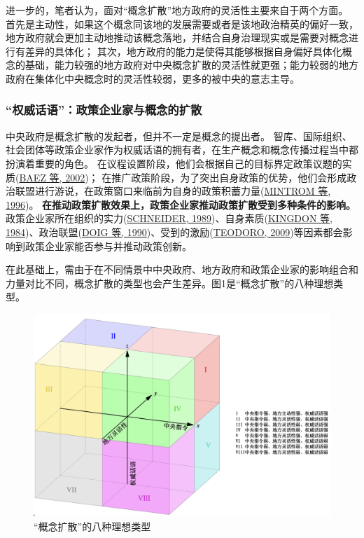 \documentclass[
  12pt,
]{ctexart}
\begin{document}
进一步的，笔者认为，面对``概念扩散''地方政府的灵活性主要来自于两个方面。
首先是主动性，如果这个概念同该地的发展需要或者是该地政治精英的偏好一致，地方政府就会更加主动地推动该概念落地，并结合自身治理现实或是需要对概念进行有差异的具体化；
其次，地方政府的能力是使得其能够根据自身偏好具体化概念的基础，能力较强的地方政府对中央概念扩散的灵活性就更强；能力较弱的地方政府在集体化中央概念时的灵活性较弱，更多的被中央的意志主导。

\hypertarget{ux6743ux5a01ux8bddux8bedux653fux7b56ux4f01ux4e1aux5bb6ux4e0eux6982ux5ff5ux7684ux6269ux6563}{%
\subsubsection{``权威话语''：政策企业家与概念的扩散}\label{ux6743ux5a01ux8bddux8bedux653fux7b56ux4f01ux4e1aux5bb6ux4e0eux6982ux5ff5ux7684ux6269ux6563}}

中央政府是概念扩散的发起者，但并不一定是概念的提出者。
智库、国际组织、社会团体等政策企业家作为权威话语的拥有者，在生产概念和概念传播过程当中都扮演着重要的角色。
在议程设置阶段，他们会根据自己的目标界定政策议题的实质(\protect\hyperlink{ref-BaezAbolafia2002}{BAEZ 等, 2002})；
在推广政策阶段，为了突出自身政策的优势，他们会形成政治联盟进行游说，在政策窗口来临前为自身的政策积蓄力量(\protect\hyperlink{ref-MintromVergari1996}{MINTROM 等, 1996})。
\textbf{在推动政策扩散效果上，政策企业家推动政策扩散受到多种条件的影响。}
政策企业家所在组织的实力(\protect\hyperlink{ref-Schneider1989}{SCHNEIDER, 1989})、自身素质(\protect\hyperlink{ref-KingdonStano1984a}{KINGDON 等, 1984})、政治联盟(\protect\hyperlink{ref-DoigHargrove1990}{DOIG 等, 1990})、受到的激励(\protect\hyperlink{ref-Teodoro2009}{TEODORO, 2009})等因素都会影响到政策企业家能否参与并推动政策创新。

在此基础上，需由于在不同情景中中央政府、地方政府和政策企业家的影响组合和力量对比不同，概念扩散的类型也会产生差异。图1是``概念扩散''的八种理想类型。

\begin{figure}

{\centering \includegraphics[width=0.9\linewidth]{../figures/frame1} 

}

\caption{“概念扩散”的八种理想类型}\label{fig:unnamed-chunk-1}
\end{figure}
\end{document}
